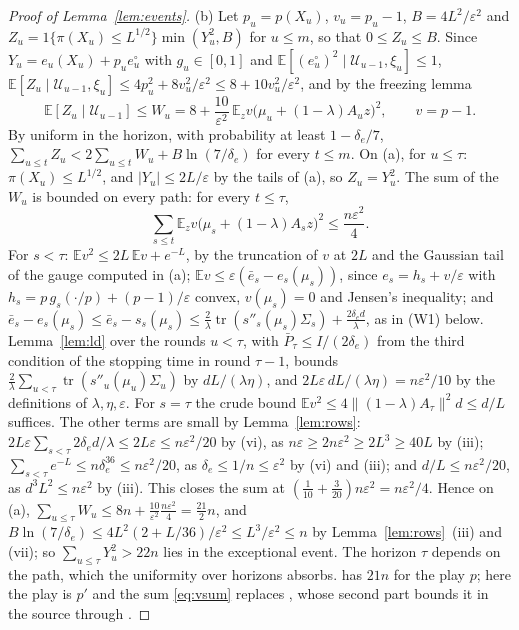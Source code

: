 \documentclass[11pt]{amsart}
\theoremstyle{definition}
\numberwithin{equation}{section}
\newcommand{\E}{\mathbb{E}}
\newcommand{\tr}{\operatorname{tr}}
\begin{document}
\begin{proof}[Proof of Lemma~\ref{lem:events}]
(b) Let $p_u=p(X_u)$, $v_u=p_u-1$, $B=4L^2/\varepsilon^2$ and $Z_u=1\{\pi(X_u)\le L^{1/2}\}\min(Y_u^2,B)$ for $u\le m$, so that $0\le Z_u\le B$. Since $Y_u=e_u(X_u)+p_ue^\circ_u$ with $g_u\in[0,1]$ and $\E[(e^\circ_u)^2\mid\mathcal U_{u-1},\xi_u]\le1$, $\E[Z_u\mid\mathcal U_{u-1},\xi_u]\le4p_u^2+8v_u^2/\varepsilon^2\le8+10v_u^2/\varepsilon^2$, and by the freezing lemma
\[
\E[Z_u\mid\mathcal U_{u-1}]\le W_u=8+\frac{10}{\varepsilon^2}\,\E_z v\bigl(\mu_u+(1-\lambda)A_uz\bigr)^2,\qquad v=p-1 .
\]
By \cite[Theorem~B.22]{Lat24} uniform in the horizon, with probability at least $1-\delta_e/7$, $\sum_{u\le t}Z_u<2\sum_{u\le t}W_u+B\ln(7/\delta_e)$ for every $t\le m$. On (a), for $u\le\tau$: $\pi(X_u)\le L^{1/2}$, and $|Y_u|\le2L/\varepsilon$ by the tails of (a), so $Z_u=Y_u^2$. The sum of the $W_u$ is bounded on every path: for every $t\le\tau$,
\begin{equation}\label{eq:vsum}
\sum_{s\le t}\E_z v\bigl(\mu_s+(1-\lambda)A_sz\bigr)^2\le\frac{n\varepsilon^2}4 .
\end{equation}
For $s<\tau$: $\E v^2\le2L\,\E v+e^{-L}$, by the truncation of $v$ at $2L$ and the Gaussian tail of the gauge computed in (a); $\E v\le\varepsilon(\bar e_s-e_s(\mu_s))$, since $e_s=h_s+v/\varepsilon$ with $h_s=p\,g_s(\cdot/p)+(p-1)/\varepsilon$ convex, $v(\mu_s)=0$ and Jensen's inequality; and $\bar e_s-e_s(\mu_s)\le\bar e_s-s_s(\mu_s)\le\frac2\lambda\tr(s''_s(\mu_s)\Sigma_s)+\frac{2\delta_ed}\lambda$, as in (W1) below. Lemma~\ref{lem:ld} over the rounds $u<\tau$, with $\bar P_\tau\le I/(2\delta_e)$ from the third condition of the stopping time in round $\tau-1$, bounds $\frac2\lambda\sum_{u<\tau}\tr(s''_u(\mu_u)\Sigma_u)$ by $dL/(\lambda\eta)$, and $2L\varepsilon\,dL/(\lambda\eta)=n\varepsilon^2/10$ by the definitions of $\lambda,\eta,\varepsilon$. For $s=\tau$ the crude bound $\E v^2\le4\|(1-\lambda)A_\tau\|^2d\le d/L$ suffices. The other terms are small by Lemma~\ref{lem:rows}: $2L\varepsilon\sum_{s<\tau}2\delta_ed/\lambda\le2L\varepsilon\le n\varepsilon^2/20$ by (vi), as $n\varepsilon\ge2n\varepsilon^2\ge2L^3\ge40L$ by (iii); $\sum_{s<\tau}e^{-L}\le n\delta_e^{36}\le n\varepsilon^2/20$, as $\delta_e\le1/n\le\varepsilon^2$ by (vi) and (iii); and $d/L\le n\varepsilon^2/20$, as $d^3L^2\le n\varepsilon^2$ by (iii). This closes the sum at $(\frac1{10}+\frac3{20})n\varepsilon^2=n\varepsilon^2/4$. Hence on (a), $\sum_{u\le\tau}W_u\le8n+\frac{10}{\varepsilon^2}\frac{n\varepsilon^2}4=\frac{21}2n$, and $B\ln(7/\delta_e)\le4L^2(2+L/36)/\varepsilon^2\le L^3/\varepsilon^2\le n$ by Lemma~\ref{lem:rows}~(iii) and (vii); so $\sum_{u\le\tau}Y_u^2>22n$ lies in the exceptional event. The horizon $\tau$ depends on the path, which the uniformity over horizons absorbs. \cite[Lemma~10.13]{Lat24} has $21n$ for the play $p$; here the play is $p'$ and the sum \eqref{eq:vsum} replaces \cite[Lemma~10.12]{Lat24}, whose second part bounds it in the source through \cite[Lemma~10.6]{Lat24}.


\end{proof}
\end{document}
